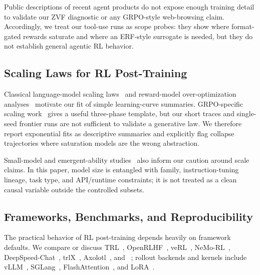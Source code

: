 Public descriptions of recent agent products do not expose enough training
detail to validate our ZVF diagnostic or any GRPO-style web-browsing claim.
Accordingly, we treat our tool-use runs as scope probes: they show where
format-gated rewards saturate and where an ERF-style surrogate is needed, but
they do not establish general agentic RL behavior.

\subsection{Scaling Laws for RL Post-Training}
\label{sec:related:scaling}

Classical language-model scaling laws~\cite{kaplan2020scalinglaws,
hoffmann2022chinchilla, muennighoff2023datascaling} and reward-model
over-optimization analyses~\cite{gao2023reward, rafailov2024rlhfscaling}
motivate our fit of simple learning-curve summaries. GRPO-specific scaling
work~\cite{nimmaturi2025scalinglaws} gives a useful three-phase template, but
our short traces and single-seed frontier runs are not sufficient to validate a
generative law. We therefore report exponential fits as descriptive summaries
and explicitly flag collapse trajectories where saturation models are the
wrong abstraction.

Small-model and emergent-ability studies~\cite{hu2024minicpm,
subramanian2025slm, schaeffer2024emergent} also inform our caution around
scale claims. In this paper, model size is entangled with family,
instruction-tuning lineage, task type, and API/runtime constraints; it is not
treated as a clean causal variable outside the controlled subsets.

\subsection{Frameworks, Benchmarks, and Reproducibility}
\label{sec:related:frameworks}

The practical behavior of RL post-training depends heavily on framework
defaults. We compare or discuss TRL~\cite{vonwerra2022trl},
OpenRLHF~\cite{hu2024openrlhf}, veRL~\cite{sheng2024verl},
NeMo-RL~\cite{nvidia2024nemorl}, DeepSpeed-Chat~\cite{yao2023deepspeedchat},
trlX~\cite{havrilla2023trlx}, Axolotl~\cite{axolotl2024}, and
\tinker{}~\cite{thinkingmachines2024tinker}; rollout backends and kernels
include vLLM~\cite{kwon2023vllm}, SGLang~\cite{zheng2024sglang},
FlashAttention~\cite{dao2022flashattention}, and LoRA~\cite{hu2022lora}.


